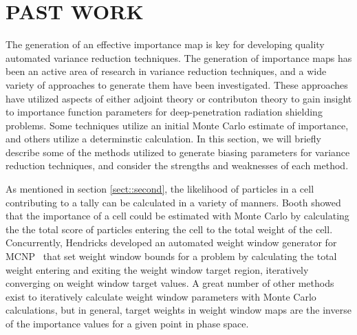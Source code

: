 \documentclass[12pt]{article}
\begin{document}


\section{PAST WORK}
\label{sect::past}

The generation of an effective importance map is key for developing quality automated variance reduction techniques. The generation of importance maps has been an active area of research in variance reduction techniques, and a wide variety of approaches to generate them have been investigated. These approaches have utilized aspects of either adjoint theory or contributon theory to gain insight to importance function parameters for deep-penetration radiation shielding problems. Some techniques utilize an initial Monte Carlo estimate of importance, and others utilize a determinstic calculation. In this section, we will briefly describe some of the methods utilized to generate biasing parameters for variance reduction techniques, and consider the strengths and weaknesses of each method.

As mentioned in section \ref{sect::second}, the likelihood of particles in a cell contributing to a tally can be calculated in a variety of manners. Booth \cite{booth_automatic_1982} showed that the importance of a cell could be estimated with Monte Carlo by calculating the the total score of particles entering the cell to the total weight of the cell. Concurrently, Hendricks \cite{hendricks_code-generated_1982} developed an automated weight window generator for MCNP~\cite{brown_mcnp_2002} that set weight window bounds for a problem by calculating the total weight entering and exiting the weight window target region, iteratively converging on weight window target values. A great number of other methods exist to iteratively calculate weight window parameters with Monte Carlo calculations, but in general, target weights in weight window maps are the inverse of the importance values for a given point in phase space.
\end{document}
